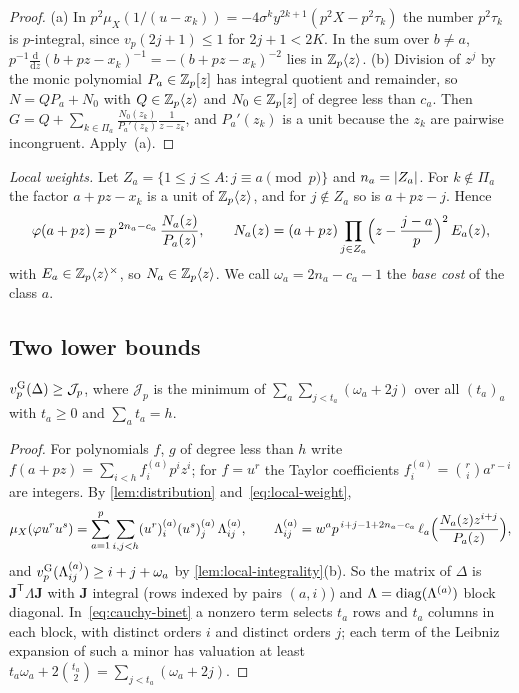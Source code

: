 \begin{proof}
(a) In $p^2\mu_X(1/(u-x_k))=-4\sigma^ky^{2k+1}(p^2X-p^2\tau_k)$ the number $p^2\tau_k$ is
$p$-integral, since $v_p(2j+1)\le1$ for $2j+1<2K$. In the sum over $b\ne a$,
$p^{-1}\frac{\mathrm d}{\mathrm dz}(b+pz-x_k)^{-1}=-(b+pz-x_k)^{-2}$ lies in $\mathbb{Z}_p\langle z\rangle$.
(b) Division of $z^j$ by the monic polynomial $P_a\in\mathbb{Z}_p[z]$ has integral quotient and
remainder, so $N=QP_a+N_0$ with $Q\in\mathbb{Z}_p\langle z\rangle$ and $N_0\in\mathbb{Z}_p[z]$ of degree less than $c_a$.
Then $G=Q+\sum_{k\in\Pi_a}\frac{N_0(z_k)}{P_a'(z_k)}\frac1{z-z_k}$, and $P_a'(z_k)$ is a unit
because the $z_k$ are pairwise incongruent. Apply~(a).
\end{proof}

\emph{Local weights.} Let $Z_a=\{1\le j\le A:j\equiv a\pmod p\}$ and $n_a=\left\lvert Z_a\right\rvert$. For $k\notin\Pi_a$ the factor
$a+pz-x_k$ is a unit of $\mathbb{Z}_p\langle z\rangle$, and for $j\notin Z_a$ so is $a+pz-j$. Hence
\begin{equation}\label{eq:local-weight}
  \varphi(a+pz)=p^{\,2n_a-c_a}\,\frac{N_a(z)}{P_a(z)},\qquad
  N_a(z)=(a+pz)\prod_{j\in Z_a}\Bigl(z-\frac{j-a}p\Bigr)^2\,E_a(z),
\end{equation}
with $E_a\in\mathbb{Z}_p\langle z\rangle^\times$, so $N_a\in\mathbb{Z}_p\langle z\rangle$. We call
$\omega_a=2n_a-c_a-1$ the \emph{base cost} of the class $a$.

\subsection{Two lower bounds}\label{subsec:two-bounds}

\begin{proposition}\label{prop:jet}
$v_{p}^{\mathrm{G}}(\Delta)\ge\mathcal J_p$, where $\mathcal J_p$ is the minimum of
$\sum_a\sum_{j<t_a}(\omega_a+2j)$ over all $(t_a)_{a}$ with $t_a\ge0$ and $\sum_at_a=h$.
\end{proposition}

\begin{proof}
For polynomials $f$, $g$ of degree less than $h$ write $f(a+pz)=\sum_{i<h}f^{(a)}_ip^iz^i$; for
$f=u^r$ the Taylor coefficients $f^{(a)}_i=\binom ri a^{r-i}$ are integers. By
\cref{lem:distribution} and~\eqref{eq:local-weight},
\[
  \mu_X(\varphi u^ru^s)=\sum_{a=1}^p\sum_{i,j<h}(u^r)^{(a)}_i(u^s)^{(a)}_j\,\Lambda^{(a)}_{ij},
  \qquad
  \Lambda^{(a)}_{ij}=w^ap^{\,i+j-1+2n_a-c_a}\,\ell_a\Bigl(\frac{N_a(z)z^{i+j}}{P_a(z)}\Bigr),
\]
and $v_{p}^{\mathrm{G}}(\Lambda^{(a)}_{ij})\ge i+j+\omega_a$ by \cref{lem:local-integrality}(b). So the matrix of
$\Delta$ is $\mathbf J^{\mathsf T}\Lambda\mathbf J$ with $\mathbf J$ integral (rows indexed by
pairs $(a,i)$) and $\Lambda=\operatorname{diag}(\Lambda^{(a)})$ block diagonal. In~\eqref{eq:cauchy-binet} a
nonzero term selects $t_a$ rows and $t_a$ columns in each block, with distinct orders $i$ and
distinct orders $j$; each term of the Leibniz expansion of such a minor has valuation at least
$t_a\omega_a+2\binom{t_a}2=\sum_{j<t_a}(\omega_a+2j)$.
\end{proof}

